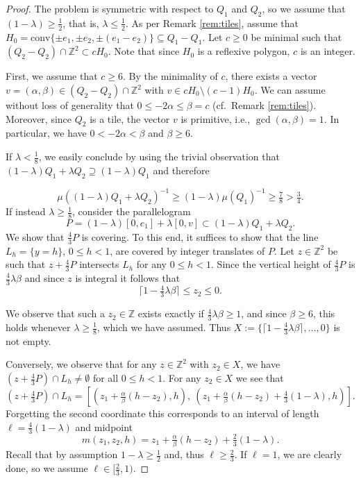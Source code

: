 \documentclass[11pt, a4paper]{amsart}
\newcommand{\ZZ}{\mathbb{Z}}
\newcommand{\conv}{\mathrm{conv}}
\numberwithin{equation}{section}
\theoremstyle{plain}
\begin{document}
\begin{proof}
The problem is symmetric with respect to $Q_1$ and $Q_2$, so we assume that $(1-\lambda)\geq \tfrac{1}{2}$, that is, $\lambda \leq \tfrac{1}{2}$.
As per Remark \ref{rem:tiles}, assume that $H_0=\conv\{\pm e_1, \pm e_2, \pm(e_1-e_2) \}\subseteq Q_1-Q_1$. Let $c\geq 0$ be minimal such that $(Q_2-Q_2)\cap \ZZ^2\subset cH_0$. 
Note that since $H_0$ is a reflexive polygon, $c$ is an integer.

First, we assume that $c\geq 6$. By the minimality of $c$, there exists a vector $v = (\alpha,\beta)\in (Q_2-Q_2)\cap\ZZ^2$ with $v\in cH_0\setminus (c-1)H_0$. We can assume without loss of generality that $0\leq -2\alpha\leq \beta = c$ (cf.\ Remark \ref{rem:tiles}). Moreover, since $Q_2$ is a tile, the vector $v$ is primitive, i.e., $\gcd(\alpha,\beta)=1$. In particular, we have $0 < -2\alpha < \beta$ and $\beta \geq 6$.

If $\lambda < \tfrac 18$, we easily conclude by using the trivial observation that $(1-\lambda)Q_1 + \lambda Q_2 \supseteq (1-\lambda)Q_1$ and therefore

\[
\mu((1-\lambda)Q_1 + \lambda Q_2)^{-1} \geq (1-\lambda)\mu(Q_1)^{-1} \geq \tfrac 78 > \tfrac 34.
\]
If instead $\lambda \geq \tfrac 18$, consider the parallelogram 
\[
P = (1-\lambda)[0,e_1] + \lambda [0,v] \subset (1-\lambda)Q_1 + \lambda Q_2.
\]
We show that $\tfrac 43 P$ is covering.
To this end, it suffices to show that the line $L_h = \{y=h\}$, $0\leq h < 1$, are covered by integer translates of $P$. 
Let $z\in\ZZ^2$ be such that $z+\tfrac 43 P$ intersects $L_h$ for any $0\leq h < 1$. Since the vertical height of $\tfrac 43 P$ is $\tfrac 43 \lambda\beta$ and since $z$ is integral it follows that
\[
\lceil 1-\tfrac 43\lambda\beta\rceil \leq z_2 \leq 0.
\]

We observe that such a $z_2 \in \ZZ$ exists exactly if $\tfrac 43 \lambda \beta \geq 1$, and since $\beta \geq 6$, this holds whenever $\lambda \geq \tfrac 18$, which we have assumed. Thus $X:= \{\lceil 1-\tfrac 43\lambda\beta\rceil,\dots,0\}$ is not empty.

Conversely, we observe that for any $z\in\ZZ^2$ with $z_2\in X$, we have $(z+\tfrac 43P)\cap L_h\neq\emptyset$ for all $0\leq h < 1$.
For any $z_2 \in X$ we see that
\[
(z+\tfrac 43 P) \cap L_h = [(z_1 + \tfrac \alpha \beta (h-z_2), h),~(z_1 + \tfrac \alpha \beta (h-z_2) + \tfrac 43(1-\lambda), h)].
\]
Forgetting the second coordinate this corresponds to an interval of length $\ell = \tfrac 43 (1-\lambda)$ and midpoint 
\[
m(z_1,z_2,h)= z_1 + \tfrac \alpha \beta (h-z_2) + \tfrac 23(1-\lambda).
\] 
Recall that by assumption $1-\lambda \geq \tfrac 12$ and, thus $\ell \geq \tfrac 23$. If $\ell = 1$, we are clearly done, so we assume $\ell\in [\tfrac 23, 1)$.


\end{proof}
\end{document}
